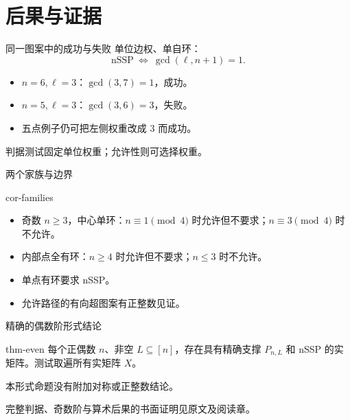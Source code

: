 \documentclass{beamer}
\begin{document}
\section{后果与证据}
\begin{frame}{同一图案中的成功与失败}
单位边权、单自环：
\[\text{nSSP}\ \Longleftrightarrow\ \gcd(\ell,n+1)=1.\]
\begin{itemize}\item $n=6,\ell=3$：$\gcd(3,7)=1$，成功。
\item $n=5,\ell=3$：$\gcd(3,6)=3$，失败。
\item 五点例子仍可把左侧权重改成 $3$ 而成功。
\end{itemize}
判据测试固定单位权重；允许性则可选择权重。
\end{frame}

\begin{frame}{两个家族与边界}
\begin{bookresult}{cor-families}
\begin{itemize}
\item 奇数 $n\geq3$，中心单环：$n\equiv1\pmod4$ 时允许但不要求；$n\equiv3\pmod4$ 时不允许。
\item 内部点全有环：$n\geq4$ 时允许但不要求；$n\leq3$ 时不允许。
\item 单点有环要求 nSSP。
\item 允许路径的有向超图案有正整数见证。
\end{itemize}
\end{bookresult}
\end{frame}

\begin{frame}{精确的偶数阶形式结论}
\begin{bookresult}{thm-even}
每个正偶数 $n$、非空 $L\subseteq[n]$，存在具有精确支撑 $P_{n,L}$ 和 nSSP 的实矩阵。测试取遍所有实矩阵 $X$。
\end{bookresult}
本形式命题没有附加对称或正整数结论。
\medskip

完整判据、奇数阶与算术后果的书面证明见原文及阅读章。
\end{frame}
\end{document}
